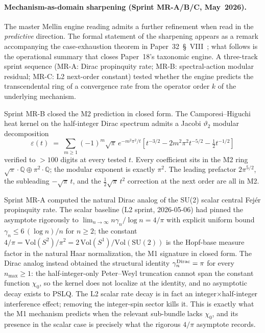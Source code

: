 \documentclass[aps,pra,twocolumn,superscriptaddress,longbibliography]{revtex4-2}
\begin{document}
\paragraph{Mechanism-as-domain sharpening (Sprint MR-A/B/C, May~2026).}
The master Mellin engine reading admits a further refinement when read
in the \emph{predictive} direction. The formal statement of the
sharpening appears as a remark accompanying the case-exhaustion theorem
in Paper~32~\S~VIII~\cite{loutey_paper32}; what follows is the
operational summary that closes Paper~18's taxonomic engine. A
three-track sprint sequence (MR-A: Dirac propinquity rate;
MR-B: spectral-action modular residual; MR-C: L2 next-order constant)
tested whether the engine predicts the transcendental ring of a
convergence rate from the operator order $k$ of the underlying mechanism.

Sprint MR-B closed the M2 prediction in closed form. The
Camporesi--Higuchi heat kernel on the half-integer Dirac spectrum
admits a Jacobi $\vartheta_2$ modular decomposition
\begin{equation}
\label{eq:dirac_modular_residual}
   \varepsilon(t) \;=\;
   \sum_{m \ge 1} (-1)^m \sqrt{\pi}\, e^{-m^2 \pi^2 / t}
     \left[ t^{-3/2} - 2 m^2 \pi^2 t^{-5/2} - \tfrac{1}{2} t^{-1/2}\right]
\end{equation}
verified to $> 100$ digits at every tested $t$. Every coefficient sits
in the M2 ring $\sqrt{\pi}\cdot\mathbb{Q} \oplus \pi^2 \cdot \mathbb{Q}$;
the modular exponent is exactly $\pi^2$. The leading prefactor
$2\pi^{5/2}$, the subleading $-\sqrt{\pi}\,t$, and the $\tfrac{1}{2}\sqrt{\pi}\,t^2$
correction at the next order are all in M2.

Sprint MR-A computed the natural Dirac analog of the SU(2) scalar
central Fej{\'e}r propinquity rate. The scalar baseline (L2 sprint,
2026-05-06) had pinned the asymptote rigorously to
$\lim_{n \to \infty} n \gamma_n / \log n = 4/\pi$ with explicit uniform
bound $\gamma_n \le 6\,(\log n)/n$ for $n \ge 2$; the constant
$4/\pi = \mathrm{Vol}(S^2)/\pi^2 = 2\,\mathrm{Vol}(S^1)/\mathrm{Vol}(\mathrm{SU}(2))$
is the Hopf-base measure factor in the natural Haar normalization, the
M1 signature in closed form. The Dirac analog instead obtained the
structural identity $\gamma_n^{\rm Dirac} = \pi$ for every $n_{\max} \ge 1$:
the half-integer-only Peter--Weyl truncation cannot span the constant
function $\chi_0$, so the kernel does not localize at the identity, and
no asymptotic decay exists to PSLQ. The L2 scalar rate decay is in
fact an integer$\times$half-integer interference effect; removing the
integer-spin sector kills it. This is exactly what the M1 mechanism
predicts when the relevant sub-bundle lacks $\chi_0$, and its presence
in the scalar case is precisely what the rigorous $4/\pi$ asymptote
records.
\end{document}
